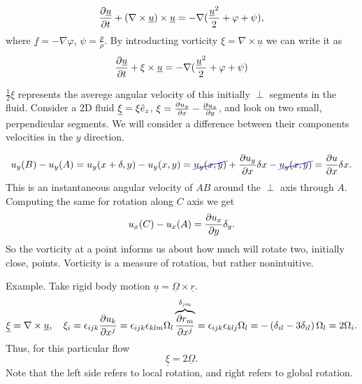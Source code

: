 \documentclass[11pt,oneside]{book}
\renewcommand{\vec}[1]{\underline{#1}}
\theoremstyle{definition} %
\theoremstyle{plain} %
\theoremstyle{remark} %
\theoremstyle{underline}
\newcommand\Ccancel[2][black]{
    \let\OldcancelColor\CancelColor
    \renewcommand\CancelColor{\color{#1}}
    \cancel{#2}
    \renewcommand\CancelColor{\OldcancelColor}
}
\let\OldcancelColor\CancelColor
\renewcommand\CancelColor{\color{#1}}
\renewcommand\CancelColor{\OldcancelColor}
\begin{document}
  \begin{displaymath}
    \ptf{\vec u}{t} + (\nabla \times \vec u) \times \vec u = - \nabla (\frac{\vec u^2}{2} + \varphi + \psi),
  \end{displaymath}
  where $\vec f = - \nabla \varphi$, $\psi = \frac{p}{\rho}$.
  By introducting vorticity $\xi = \nabla \times \vec u$ we can write it as
  \begin{displaymath}
    \ptf{\vec u}{t} + \xi \times \vec u = - \nabla (\frac{\vec u^2}{2} + \varphi + \psi)
  \end{displaymath}

  
  $\frac{1}{2}\xi$ represents the averege angular velocity of this initially $\perp$ segments in the fluid.
  Consider a $2$D fluid $\vec \xi = \xi \vez$, $\xi = \frac{\partial u_y}{\partial x} - \frac{\partial u_x}{\partial y}$, and look on two
  small, perpendicular segments. We will consider a difference between their components velocities in the $y$ direction.
  \begin{figure}[h]
    \centering
    \label{fig:}
  \end{figure}
  \begin{displaymath}
    u_y(B) - u_y(A) = u_y(x + \delta, y)- u_y(x, y) 
    = \Ccancel[blue]{u_y(x, y)} + \ptf{u_y}{x} \delta x - \Ccancel[blue]{u_y(x, y)}
    = \ptf{u}{x} \delta x.
  \end{displaymath}
  This is an instantaneous  angular velocity of $AB$ around the $\perp$ axis through $A$.
  Computing the same for rotation along $C$ axis we get
  \begin{displaymath}
    u_x(C) - u_x(A) = \frac{\partial u_x}{\partial y} \delta_y.
  \end{displaymath}
  So the vorticity at a point informs us about how much will rotate two, initially close, points. %
  Vorticity is a measure of rotation, but rather nonintuitive.
  
  Example. Take rigid body motion $\vec u = \vec \Omega \times \vec r$.
  \begin{displaymath}
    \vec \xi = \nabla \times \vec u , \quad \xi_i 
    = \epsilon_{ijk} \ptf{u_k}{x^j}
    = \epsilon_{ijk} \epsilon_{klm} \Omega_l \overbrace{\ptf{r_m}{x^j}}^{\delta_{jm}}
    = \epsilon_{ijk} \epsilon_{klj} \Omega_l 
    = - \left( \delta_{il} - 3 \delta_{il} \right) \Omega_l = 2 \Omega_i.
  \end{displaymath}
  Thus, for this particular flow
  \begin{displaymath}
    \vec \xi = 2 \vec \Omega.
  \end{displaymath}
  Note that the left side refers to local rotation, and right refers to global rotation.
\end{document}
